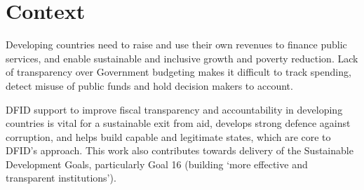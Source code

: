 \section{Context}

Developing countries need to raise and use their own revenues to finance public services, and enable sustainable and inclusive growth and poverty reduction. %
Lack of transparency over Government budgeting makes it difficult to track spending, detect
misuse of public funds and hold decision makers to account. %

DFID support to improve fiscal transparency and accountability in developing countries is vital for a sustainable exit from aid, develops strong defence against corruption, and helps build capable and legitimate states, which are core to DFID's approach. %
This work also contributes towards delivery of the Sustainable Development Goals,
particularly Goal 16 (building `more effective and transparent institutions'). %

\newpage

